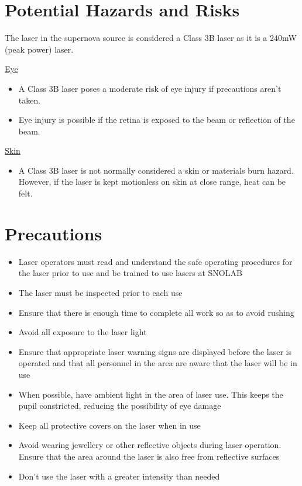 \section{Potential Hazards and Risks}
The laser in the supernova source is considered a Class 3B laser as it is a 240mW (peak power) laser. 

\underline{Eye}
\begin{itemize}
\item A Class 3B laser poses a moderate risk of eye injury if precautions aren't taken. 
\item Eye injury is possible if the retina is exposed to the beam or reflection of the beam. 
\end{itemize}

\underline{Skin}
\begin{itemize}
\item A Class 3B laser is not normally considered a skin or materials burn hazard. However, if the laser is kept motionless on skin at close range, heat can be felt. 
\end{itemize}

\section{Precautions}
\begin{itemize}
    \item Laser operators must read and understand the safe operating procedures for the laser prior to use and be trained to use lasers at SNOLAB
    \item The laser must be inspected prior to each use
    \item Ensure that there is enough time to complete all work so as to avoid rushing
    \item Avoid all exposure to the laser light
    \item Ensure that appropriate laser warning signs are displayed before the laser is operated and that all personnel in the area are aware that the laser will be in use
    \item When possible, have ambient light in the area of laser use. This keeps the pupil constricted, reducing the possibility of eye damage
    \item Keep all protective covers on the laser when in use
    \item Avoid wearing jewellery or other reflective objects during laser operation. Ensure that the area around the laser is also free from reflective surfaces
    \item Don't use the laser with a greater intensity than needed
\end{itemize}
